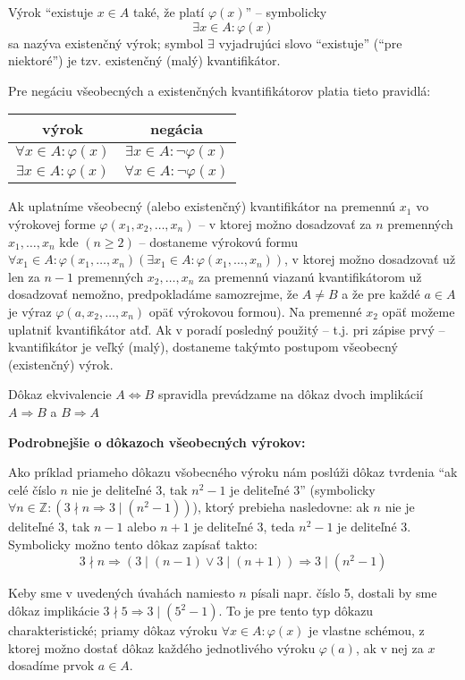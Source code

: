 Výrok \enquote{existuje $x \in A$ také, že platí $\varphi (x)$} -- symbolicky
\[
  \exists x \in A : \varphi (x)
\]
sa nazýva existenčný výrok; symbol $\exists$ vyjadrujúci slovo
\enquote{existuje} (\enquote{pre niektoré}) je tzv. existenčný (malý)
kvantifikátor.

Pre negáciu všeobecných a existenčných kvantifikátorov platia tieto pravidlá:
\begin{center}
  \begin{tabular}{c | c}
    výrok & negácia \\
    \hline
    $\forall x \in A : \varphi (x)$ & $\exists x \in A : \neg \varphi (x)$ \\
    $\exists x \in A : \varphi (x)$ & $\forall x \in A : \neg \varphi (x)$ \\
  \end{tabular}
\end{center}

Ak uplatníme všeobecný (alebo existenčný) kvantifikátor na premennú $x_1$ vo
výrokovej forme $\varphi(x_1, x_2, \ldots, x_n)$ -- v ktorej možno dosadzovať za
$n$ premenných $x_1, \ldots, x_n$ kde $(n \geq 2)$ -- dostaneme výrokovú formu
$\forall x_1 \in A: \varphi (x_1, \ldots, x_n) (\exists x_1 \in A: \varphi
(x_1, \ldots, x_n))$, v ktorej možno dosadzovať už len za $n - 1$ premenných
$x_2, \ldots, x_n$ za premennú viazanú kvantifikátorom už dosadzovať nemožno,
predpokladáme samozrejme, že $A \neq B$ a že pre každé $a \in A$ je výraz
$\varphi (a, x_2, \ldots, x_n)$ opäť výrokovou formou). Na premenné $x_2$ opäť
možeme uplatniť kvantifikátor atď. Ak v poradí posledný použitý -- t.j. pri
zápise prvý -- kvantifikátor je veľký (malý), dostaneme takýmto postupom
všeobecný (existenčný) výrok.

Dôkaz ekvivalencie $A \iff B$ spravidla prevádzame na dôkaz dvoch implikácií
$A \Rightarrow B$ a $B \Rightarrow A$

\textbf{Podrobnejšie o dôkazoch všeobecných výrokov:}

Ako príklad priameho dôkazu všobecného výroku nám poslúži dôkaz tvrdenia
\enquote{ak celé číslo $n$ nie je deliteľné 3, tak $n^2 - 1$ je deliteľné 3}
(symbolicky $\forall n \in \mathbb{Z}: (3 \nmid n \Rightarrow 3 \mid
(n^2 - 1))$), ktorý prebieha nasledovne: ak $n$ nie je deliteľné 3, tak
$n - 1$ alebo $n + 1$ je deliteľné 3, teda $n^2 - 1$ je deliteľné 3. Symbolicky
možno tento dôkaz zapísať takto:
\[
3 \nmid n
\Rightarrow (3 \mid (n - 1) \lor 3 \mid (n + 1))
\Rightarrow 3 \mid (n^2 - 1)
\]

Keby sme v uvedených úvahách namiesto $n$ písali napr. číslo 5, dostali by sme
dôkaz implikácie $3 \nmid 5 \Rightarrow 3 \mid (5^2 - 1)$. To je pre tento typ
dôkazu charakteristické; priamy dôkaz výroku $\forall x \in A: \varphi (x)$ je
vlastne schémou, z ktorej možno dostať dôkaz každého jednotlivého výroku
$\varphi (a)$, ak v nej za $x$ dosadíme prvok $a \in A$.

